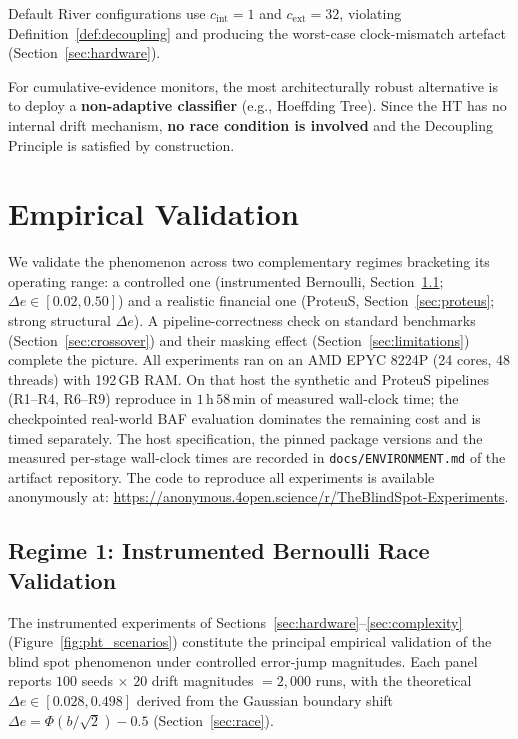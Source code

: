 \documentclass[10pt,conference]{IEEEtran}
\theoremstyle{definition}
\newcommand{\RepoURL}{https://anonymous.4open.science/r/TheBlindSpot-Experiments}
\begin{document}
Default River configurations use $c_{\mathrm{int}} = 1$ and $c_{\mathrm{ext}} = 32$, violating Definition~\ref{def:decoupling} and producing the worst-case clock-mismatch artefact (Section~\ref{sec:hardware}).

For cumulative-evidence monitors, the most architecturally robust alternative is to deploy a \textbf{non-adaptive classifier} (e.g., Hoeffding Tree). Since the HT has no internal drift mechanism, \textbf{no race condition is involved} and the Decoupling Principle is satisfied by construction.

\section{Empirical Validation}\label{sec:experiments}

We validate the phenomenon across two complementary regimes bracketing its operating range: a controlled one (instrumented Bernoulli, Section~\ref{sec:bernoulli_validation}; $\Delta e \in [0.02, 0.50]$) and a realistic financial one (ProteuS, Section~\ref{sec:proteus}; strong structural $\Delta e$). A pipeline-correctness check on standard benchmarks (Section~\ref{sec:crossover}) and their masking effect (Section~\ref{sec:limitations}) complete the picture. All experiments ran on an AMD EPYC 8224P (24 cores, 48 threads) with 192\,GB RAM. On that host the synthetic and ProteuS pipelines (R1--R4, R6--R9) reproduce in $1$\,h\,$58$\,min of measured wall-clock time; the checkpointed real-world BAF evaluation dominates the remaining cost and is timed separately. The host specification, the pinned package versions and the measured per-stage wall-clock times are recorded in \texttt{docs/ENVIRONMENT.md} of the artifact repository. The code to reproduce all experiments is available anonymously at: \url{\RepoURL}.

\subsection{Regime 1: Instrumented Bernoulli Race Validation}\label{sec:bernoulli_validation}

The instrumented experiments of Sections~\ref{sec:hardware}--\ref{sec:complexity} (Figure~\ref{fig:pht_scenarios}) constitute the principal empirical validation of the blind spot phenomenon under controlled error-jump magnitudes. Each panel reports $100$ seeds $\times$ $20$ drift magnitudes $= 2{,}000$ runs, with the theoretical $\Delta e \in [0.028, 0.498]$ derived from the Gaussian boundary shift $\Delta e = \Phi(b/\sqrt{2}) - 0.5$ (Section~\ref{sec:race}).
\end{document}
